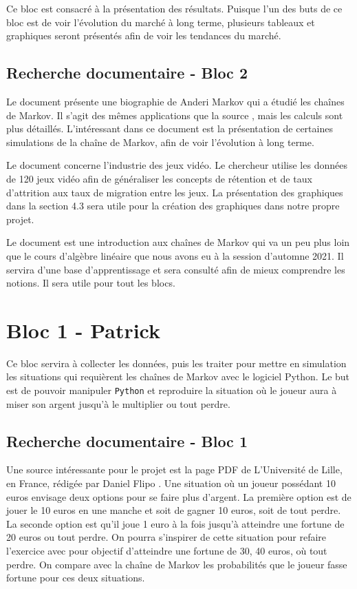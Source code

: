 \documentclass[10pt]{article}
\begin{document}
Ce bloc est consacré à la présentation des résultats. Puisque l’un des buts de ce bloc est de voir l’évolution du marché à long terme, plusieurs tableaux et graphiques seront présentés afin de voir les tendances du marché.

\subsection{Recherche documentaire - Bloc 2}

Le document \cite{biographieMarkov} présente une biographie de Anderi Markov qui a étudié les chaînes de Markov. Il s’agit des mêmes applications que la source \cite{introductionEnAnglais}, mais les calculs sont plus détaillés. L'intéressant dans ce document est la présentation de certaines simulations de la chaîne de Markov, afin de voir l’évolution à long terme.  

Le document \cite{modelisation} concerne l’industrie des jeux vidéo. Le chercheur utilise les données de 120 jeux vidéo afin de généraliser les concepts de rétention et de taux d’attrition aux taux de migration entre les jeux. La présentation des graphiques dans la section 4.3 sera utile pour la création des graphiques dans notre propre projet.

Le document \cite{baseInformation} est une introduction aux chaînes de Markov qui va un peu plus loin que le cours d’algèbre linéaire que nous avons eu à la session d’automne 2021.  Il servira d’une base d’apprentissage et sera consulté afin de mieux comprendre les notions. Il sera utile pour tout les blocs.

\section{Bloc 1 - Patrick}
Ce bloc servira à collecter les données, puis les traiter pour mettre en simulation les situations qui requièrent les chaînes de Markov avec le logiciel Python. Le but est de pouvoir manipuler \texttt{Python} et reproduire la situation où le joueur aura à miser son argent jusqu’à le multiplier ou tout perdre.

\subsection{Recherche documentaire - Bloc 1}

Une source intéressante pour le projet est la page PDF de L’Université de Lille, en France, rédigée par Daniel Flipo \cite{docFlipo}. Une situation où un joueur possédant 10 euros envisage deux options pour se faire plus d’argent. La première option est de jouer le 10 euros en une manche et soit de gagner 10 euros, soit de tout perdre. La seconde option est qu’il joue 1 euro à la fois jusqu’à atteindre une fortune de 20 euros ou tout perdre. On pourra s’inspirer de cette situation pour refaire l’exercice avec pour objectif d’atteindre une fortune de 30, 40 euros, où tout perdre. On compare avec la chaîne de Markov les probabilités que le joueur fasse fortune pour ces deux situations. 
\end{document}
